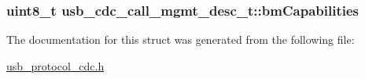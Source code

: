 \label{structusb__cdc__call__mgmt__desc__t_aafa3f523e8bc96b0cd539637d03aaf6b}
\hypertarget{structusb__cdc__call__mgmt__desc__t_ae6648388cc0a5e305a3e87ab62f9e24f}{
\subsubsection[{bm\-Capabilities}]{\setlength{\rightskip}{0pt plus 5cm}uint8\-\_\-t {\bf usb\-\_\-cdc\-\_\-call\-\_\-mgmt\-\_\-desc\-\_\-t\-::bm\-Capabilities}}}
\label{structusb__cdc__call__mgmt__desc__t_ae6648388cc0a5e305a3e87ab62f9e24f}


\-The documentation for this struct was generated from the following file\-:\begin{DoxyCompactItemize}
\item 
\hyperlink{usb__protocol__cdc_8h}{usb\-\_\-protocol\-\_\-cdc.\-h}\end{DoxyCompactItemize}
